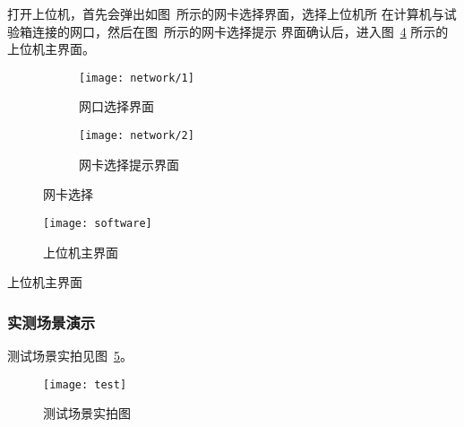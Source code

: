 \documentclass[../main]{subfiles}
\begin{document}
打开上位机，首先会弹出如图~所示的网卡选择界面，选择上位机所
在计算机与试验箱连接的网口，然后在图~所示的网卡选择提示
界面确认后，进入图~\ref{fig:software} 所示的上位机主界面。

\begin{figure}[htbp]
  \centering
  \begin{subfigure}[htbp]{0.45\linewidth}
    \centering
    \texttt{[image: network/1]}
    \caption{网口选择界面}%
    \label{fig:network/1}
  \end{subfigure}
  \quad
  \begin{subfigure}[htbp]{0.45\linewidth}
    \centering
    \texttt{[image: network/2]}
    \caption{网卡选择提示界面}%
    \label{fig:network/2}
  \end{subfigure}
  \caption{网卡选择}%
  \label{fig:network}
\end{figure}

\begin{figure}[htbp]
  \centering
  \texttt{[image: software]}
  \caption{上位机主界面}%
  \label{fig:software}
\end{figure}

\begin{table}[htbp]
  \centering
  \caption{上位机主界面}%
  \label{tab:software}
\end{table}

\subsubsection{实测场景演示}%
\label{ssub:test}

测试场景实拍见图~\ref{fig:test}。

\begin{figure}[htbp]
  \centering
  \texttt{[image: test]}
  \caption{测试场景实拍图}%
  \label{fig:test}
\end{figure}
\end{document}
